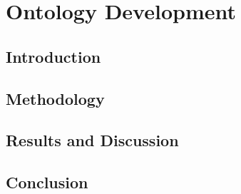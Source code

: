\chapter{Ontology Development}
\label{chap:a}

\section{Introduction}

\section{Methodology}

\section{Results and Discussion}

\section{Conclusion}
